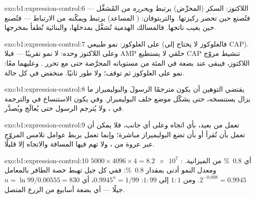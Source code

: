 \begin{solution}{exo:b1:expression-control:6}
اللاكتوز: السكر (المحرِّض) يرتبط  و\emph{يحرره} من
المُشغِّل --- فتُصنع  حين تحضر ركيزتها. والتربتوفان:  ( المساعد) يرتبط  و\emph{يمكّنه} من الارتباط
--- فتُصنع  حين يغيب ناتجها. فالمسالك الهدمية تُشغَّل
بمدخلها، والبنائية تُطفأ بمخرجها.
\end{solution}

\begin{solution}{exo:b1:expression-control:7}
على الغلوكوز: نمو طبيعي (فالغلوكوز لا يحتاج إلى CAP). وعلى اللاكتوز
وحده: لا نمو تقريبًا --- فبلا AMP حلقي لا يستطيع CAP تنشيط مروّج
اللاكتوز، فيبقى  عند بضعة في المئة من مستوياته المحرَّضة حتى
مع تحرر . وعليهما معًا: نمو على الغلوكوز ثم توقف؛ ولا طور
ثانيًا.  منخفض في كل حالة.
\end{solution}

\begin{solution}{exo:b1:expression-control:8}
يقتضي التوهين أن يكون  مترجمًا الرسولَ والبوليميراز ما يزال
يستنسخه، حتى يشكّل موضع   خلف البوليميراز. وفي  يكون الاستنساخ في  والترجمة في ، ولا يُترجم
الرسول حتى يُعالَج ويُصدَّر.
\end{solution}

\begin{solution}{exo:b1:expression-control:9}
تعمل  من بعيد، بأي اتجاه وعلى أي جانب، فلا يمكن أن تعمل
بأن تُقرأ أو بأن تضع البوليميراز مباشرة؛ وإنما تعمل بربط عوامل
تلامس المروّج عبر عروة من ، ولا تهم فيها المسافة والاتجاه إلا
قليلًا.
\end{solution}

\begin{solution}{exo:b1:expression-control:10}
$5000\times 4096\times 4 = \num{8.2e7}$ : أي \qty{0.8}{\%} من
الميزانية. ومعدل النمو أدنى بمقدار \qty{0.8}{\%}: ففي كل جيل تهبط حصة
الطافر بالمعامل $2^{-0.008} = 0.9945$. ومن $1:1$ إلى
$1:99$: $0.9945^n = 1/99$، أي $n = \ln 99/0.00555 = 830$ جيلًا ---
أي بضعة أسابيع من الزرع المتصل.
\end{solution}

